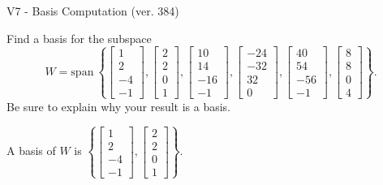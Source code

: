 \begin{exercise}
  \begin{exerciseTitle}V7 - Basis Computation (ver. 384)\end{exerciseTitle}
  \begin{exerciseStatement}
    Find a basis for the subspace 
\[W=\mathrm{span}\ \left\{\left[\begin{array}{r}
1 \\
2 \\
-4 \\
-1
\end{array}\right] , \left[\begin{array}{r}
2 \\
2 \\
0 \\
1
\end{array}\right] , \left[\begin{array}{r}
10 \\
14 \\
-16 \\
-1
\end{array}\right] , \left[\begin{array}{r}
-24 \\
-32 \\
32 \\
0
\end{array}\right] , \left[\begin{array}{r}
40 \\
54 \\
-56 \\
-1
\end{array}\right] , \left[\begin{array}{r}
8 \\
8 \\
0 \\
4
\end{array}\right]\right\}.\]
 Be sure to explain why your result is a basis.


  \end{exerciseStatement}
  \begin{exerciseAnswer}
   A basis of \(W\) is  \(\left\{\left[\begin{array}{r}
1 \\
2 \\
-4 \\
-1
\end{array}\right] , \left[\begin{array}{r}
2 \\
2 \\
0 \\
1
\end{array}\right]\right\}\).
  


  \end{exerciseAnswer}
\end{exercise}